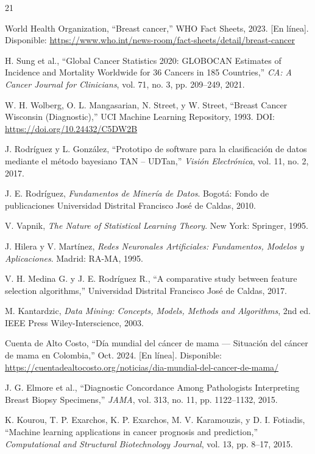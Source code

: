 \documentclass[journal]{IEEEtran}
\begin{document}
\begin{thebibliography}{21}

World Health Organization, ``Breast cancer,'' WHO Fact Sheets, 2023. [En línea]. Disponible: \url{https://www.who.int/news-room/fact-sheets/detail/breast-cancer}

H. Sung et al., ``Global Cancer Statistics 2020: GLOBOCAN Estimates of Incidence and Mortality Worldwide for 36 Cancers in 185 Countries,'' \textit{CA: A Cancer Journal for Clinicians}, vol. 71, no. 3, pp. 209--249, 2021.

W. H. Wolberg, O. L. Mangasarian, N. Street, y W. Street, ``Breast Cancer Wisconsin (Diagnostic),'' UCI Machine Learning Repository, 1993. DOI: \url{https://doi.org/10.24432/C5DW2B}

J. Rodríguez y L. González, ``Prototipo de software para la clasificación de datos mediante el método bayesiano TAN -- UDTan,'' \textit{Visión Electrónica}, vol. 11, no. 2, 2017.

J. E. Rodríguez, \textit{Fundamentos de Minería de Datos}. Bogotá: Fondo de publicaciones Universidad Distrital Francisco José de Caldas, 2010.

V. Vapnik, \textit{The Nature of Statistical Learning Theory}. New York: Springer, 1995.

J. Hilera y V. Martínez, \textit{Redes Neuronales Artificiales: Fundamentos, Modelos y Aplicaciones}. Madrid: RA-MA, 1995.

V. H. Medina G. y J. E. Rodríguez R., ``A comparative study between feature selection algorithms,'' Universidad Distrital Francisco José de Caldas, 2017.

M. Kantardzic, \textit{Data Mining: Concepts, Models, Methods and Algorithms}, 2nd ed. IEEE Press Wiley-Interscience, 2003.

Cuenta de Alto Costo, ``Día mundial del cáncer de mama --- Situación del cáncer de mama en Colombia,'' Oct. 2024. [En línea]. Disponible: \url{https://cuentadealtocosto.org/noticias/dia-mundial-del-cancer-de-mama/}

J. G. Elmore et al., ``Diagnostic Concordance Among Pathologists Interpreting Breast Biopsy Specimens,'' \textit{JAMA}, vol. 313, no. 11, pp. 1122--1132, 2015.

K. Kourou, T. P. Exarchos, K. P. Exarchos, M. V. Karamouzis, y D. I. Fotiadis, ``Machine learning applications in cancer prognosis and prediction,'' \textit{Computational and Structural Biotechnology Journal}, vol. 13, pp. 8--17, 2015.


\end{thebibliography}
\end{document}
